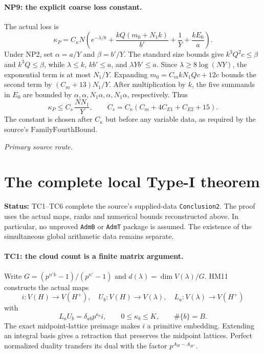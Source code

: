 \documentclass[11pt,a4paper]{article}
\numberwithin{equation}{section}
\theoremstyle{remark}\newtheorem{remark}[theorem]{Remark}
\newcommand{\status}[1]{\textbf{Status:} #1}
\begin{document}
\paragraph{NP9: the explicit coarse loss constant.}
The actual loss is
\[
 \kappa_P=C_\kappa N\left(e^{-\lambda/8}
       +\frac{kQ(m_0+N_1k)}{b'}+\frac1Y+\frac{kE_0}a\right).
\]
Under NP2, set $\alpha=a/Y$ and $\beta=b'/Y$.
The standard size bounds give
$k^3Q^2c\le\beta$ and $k^3Q\le\beta$, while
$\lambda\le k$, $kb'\le a$, and $\lambda Yb'\le a$.
Since $\lambda\ge8\log(NY)$, the exponential term is at most $N_1/Y$.
Expanding $m_0=C_mkN_1Qc+12c$ bounds the second term by
$(C_m+13)N_1/Y$.
After multiplication by $k$, the five summands in $E_0$ are bounded
by $\alpha,\alpha,N_1\alpha,\alpha,N_1\alpha$, respectively.
Thus
\[
 \boxed{\quad\kappa_P\le C_s\,\frac{NN_1}{Y},\qquad
 C_s=C_\kappa(C_m+4C_{E1}+C_{E2}+15).\quad}          \tag{NP.12}
\]
The constant is chosen after $C_\kappa$ but before any variable data,
as required by the source's $\mathrm{FamilyFourthBound}$.


\noindent\textit{Primary source route.}\cite{type-one-numerical}


\section{The complete local Type-I theorem}
\label{sec:type-one-closure}

\status{TC1--TC6 complete the source's supplied-data
\texttt{Conclusion2}. The proof uses the actual maps, ranks and
numerical bounds reconstructed above. In particular, no unproved
\texttt{AdmB} or \texttt{AdmT} package is assumed. The existence of
the simultaneous global arithmetic data remains separate.}

\paragraph{TC1: the cloud count is a finite matrix argument.}
Write $G=(p^{n'k}-1)/(p^{n'}-1)$ and
$d(\lambda)=\dim V(\lambda)/G$. HM11 constructs the actual maps
\[
 i:V(H)\longrightarrow V(H^+),\quad
 U_b:V(H)\longrightarrow V(\lambda),\quad
 L_a:V(\lambda)\longrightarrow V(H^+)
\]
with
\[
 L_aU_b=\delta_{ab}p^{\kappa_b}i,\qquad
 0\le\kappa_b\le K,\qquad \#\{b\}=B.                    \tag{TC.1}
\]
The exact midpoint-lattice preimage makes $i$ a primitive
embedding. Extending an integral basis gives a retraction that
preserves the midpoint lattices. Perfect normalized duality
transfers its dual with the factor $p^{A_H-A_{H^+}}$.
\end{document}
